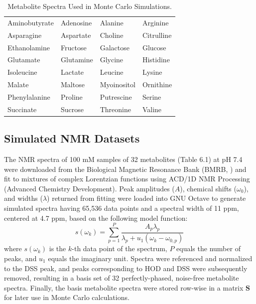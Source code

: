 \begin{table}[h!]
\caption{Metabolite Spectra Used in Monte Carlo Simulations.}
\begin{center}
\begin{tabular}{l l l l}
  \hline
  Aminobutyrate & Adenosine & Alanine     & Arginine   \\
  Asparagine    & Aspartate & Choline     & Citrulline \\
  Ethanolamine  & Fructose  & Galactose   & Glucose    \\
  Glutamate     & Glutamine & Glycine     & Histidine  \\
  Isoleucine    & Lactate   & Leucine     & Lysine     \\
  Malate        & Maltose   & Myoinositol & Ornithine  \\
  Phenylalanine & Proline   & Putrescine  & Serine     \\
  Succinate     & Sucrose   & Threonine   & Valine
\end{tabular}
\end{center}
\end{table}

\subsection{Simulated NMR Datasets}

\begin{doublespace}
The \hnmr{} NMR spectra of 100 mM samples of 32 metabolites (Table 6.1) at
pH 7.4 were downloaded from the Biological Magnetic Resonance Bank
(BMRB, \cite{ulrich:nar2008}) and fit to mixtures of complex Lorentzian
functions using ACD/1D NMR Processing (Advanced Chemistry Development).
Peak amplitudes ($A$), chemical shifts ($\omega_0$), and widths ($\lambda$)
returned from fitting were loaded into GNU Octave to generate simulated spectra
having 65,536 data points and a spectral width of 11 ppm, centered at
4.7 ppm, based on the following model function:
\begin{equation}
s(\omega_k) =
 \sum_{p=1}^P
 \frac{A_p \lambda_p}
      {\lambda_p + u_1 (\omega_k - \omega_{0,p})}
\end{equation}
where $s(\omega_k)$ is the $k$-th data point of the spectrum, $P$ equals the
number of peaks, and $u_1$ equals the imaginary unit. Spectra were referenced
and normalized to the DSS peak, and peaks corresponding to HOD and DSS were
subsequently removed, resulting in a basis set of 32 perfectly-phased,
noise-free metabolite spectra. Finally, the basis metabolite spectra were
stored row-wise in a matrix $\mathbf{S}$ for later use in Monte Carlo
calculations.
\end{doublespace}


